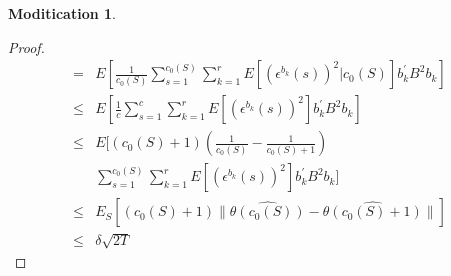 \documentclass{article}
\theoremstyle{plain}
\theoremstyle{definition}
\newtheorem{modification}{Moditication}
\begin{document}
\begin{modification}
\begin{proof}
\begin{align}
= & E[\frac{1}{c_{0}(S)}\sum_{s=1}^{c_{0}(S)}\sum_{k=1}^{r}E[(\epsilon^{b_{k}}(s))^{2}|c_{0}(S)]b_{k}^{'}B^{2}b_{k}] \nonumber \\
\leq & E[\frac{1}{c}\sum_{s=1}^{c}\sum_{k=1}^{r}E[(\epsilon^{b_{k}}(s))^{2}]b_{k}^{'}B^{2}b_{k}] \nonumber \\
\leq & E[(c_{0}(S)+1)(\frac{1}{c_{0}(S)}-\frac{1}{c_{0}(S)+1}) \nonumber \\
&\sum_{s=1}^{c_{0}(S)}\sum_{k=1}^{r}E[(\epsilon^{b_{k}}(s))^{2}]b_{k}^{'}B^{2}b_{k}] \nonumber \\
\leq & E_{S}[(c_{0}(S)+1)\|\hat{\theta(c_{0}(S))}-\hat{\theta(c_{0}(S)+1)}\|] \nonumber \\
\leq & \delta \sqrt{2T} \nonumber 
\end{align}

\end{proof}




\end{modification}
\end{document}

